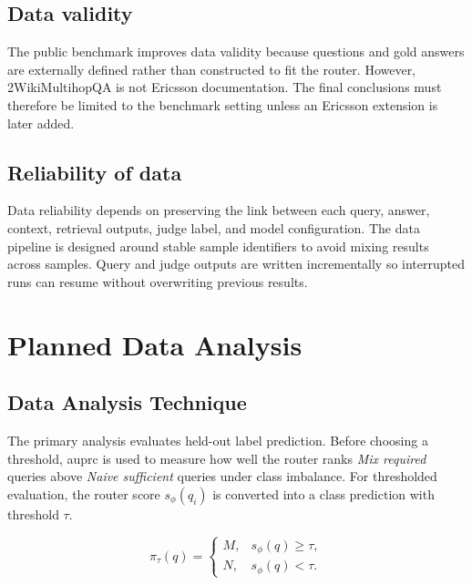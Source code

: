 \documentclass[english, bibtex]{kththesis}               %
\numberwithin{listing}{chapter}
\begin{document}
\subsection{Data validity}
\label{sec:dataValidity}

The public benchmark improves data validity because questions and gold answers are externally defined rather than constructed to fit the router. However, 2WikiMultihopQA is not Ericsson documentation. The final conclusions must therefore be limited to the benchmark setting unless an Ericsson extension is later added.

\subsection{Reliability of data}
\label{sec:reliabilityOfData}

Data reliability depends on preserving the link between each query, answer, context, retrieval outputs, judge label, and model configuration. The data pipeline is designed around stable sample identifiers to avoid mixing results across samples. Query and judge outputs are written incrementally so interrupted runs can resume without overwriting previous results.

\section{Planned Data Analysis}
\label{sec:plannedDataAnalysis}

\subsection{Data Analysis Technique}
\label{sec:dataAnalysisTechnique}

The primary analysis evaluates held-out label prediction. Before choosing a threshold, \gls{auprc} is used to measure how well the router ranks \emph{Mix required} queries above \emph{Naive sufficient} queries under class imbalance. For thresholded evaluation, the router score \(s_\phi(q_i)\) is converted into a class prediction with threshold \(\tau\).

\begin{equation}
\label{eq:routingPolicy}
\pi_\tau(q)=
\begin{cases}
M, & s_\phi(q) \geq \tau,\\
N, & s_\phi(q) < \tau.
\end{cases}
\end{equation}
\end{document}
